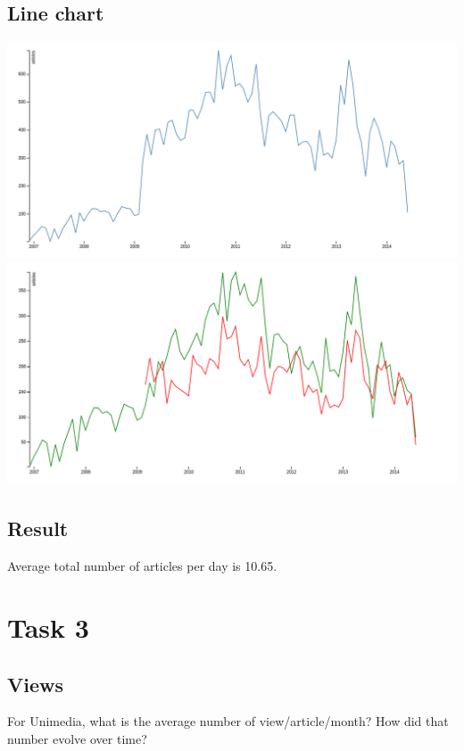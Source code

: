\documentclass[12pt,a4paper]{article}
\begin{document}
\subsection*{Line chart}
\begin{center}
 \includegraphics[width=6in]{Lab3d1.png}
 \includegraphics[width=6in]{Lab3d2.png}
\end{center}

\subsection*{Result}
Average total number of articles per day is 10.65.


\section*{Task 3}
 \subsection*{Views}
 For Unimedia, what is the average number of view/article/month? How did
that number evolve over time?
\end{document}
